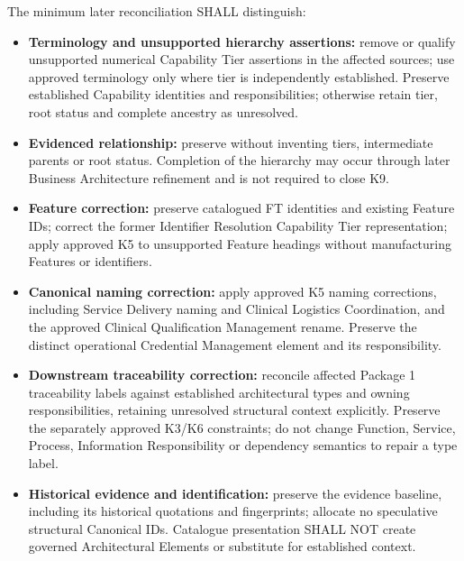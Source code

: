 The minimum later reconciliation SHALL distinguish:

\label{rad:k9:1473}

\begin{itemize}

\item
\textbf{Terminology and unsupported hierarchy assertions:} remove or qualify unsupported numerical Capability Tier assertions in the affected sources; use approved terminology only where tier is independently established. Preserve established Capability identities and responsibilities; otherwise retain tier, root status and complete ancestry as unresolved.



\item
\textbf{Evidenced relationship:} preserve \texttt{} without inventing tiers, intermediate parents or root status. Completion of the hierarchy may occur through later Business Architecture refinement and is not required to close K9.



\item
\textbf{Feature correction:} preserve catalogued FT identities and existing Feature IDs; correct the former Identifier Resolution Capability Tier representation; apply approved K5 to unsupported Feature headings without manufacturing Features or identifiers.



\item
\textbf{Canonical naming correction:} apply approved K5 naming corrections, including Service Delivery naming and Clinical Logistics Coordination, and the approved Clinical Qualification Management rename. Preserve the distinct operational Credential Management element and its responsibility.



\item
\textbf{Downstream traceability correction:} reconcile affected Package 1 traceability labels against established architectural types and owning responsibilities, retaining unresolved structural context explicitly. Preserve the separately approved K3/\allowbreak{}K6 constraints; do not change Function, Service, Process, Information Responsibility or dependency semantics to repair a type label.



\item
\textbf{Historical evidence and identification:} preserve the evidence baseline, including its historical quotations and fingerprints; allocate no speculative structural Canonical IDs. Catalogue presentation SHALL NOT create governed Architectural Elements or substitute for established context.



\end{itemize}
\label{rad:k9:1480}

